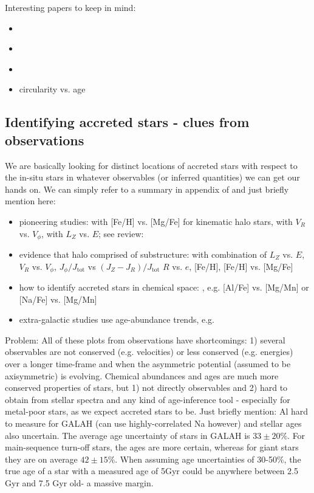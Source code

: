 \documentclass[fleqn,usenatbib]{mnras}
\begin{document}
Interesting papers to keep in mind:
\begin{itemize}
    \item \citet{Martig2021}
    \item \citet{GarciadelaCruz2021, GarciadelaCruz2021b}
    \item \citet{Pinna2019,Pinna2019b}
    \item circularity vs. age \citet{Zhu2022}
\end{itemize}

\subsection{Identifying accreted stars - clues from observations}

We are basically looking for distinct locations of accreted stars with respect to the in-situ stars in whatever observables (or inferred quantities) we can get our hands on. We can simply refer to a summary in appendix of \citet{Buder2022} and just briefly mention here:
\begin{itemize}
    \item pioneering studies: \citet{Nissen2010} with [Fe/H] vs. [Mg/Fe] for kinematic halo stars, \citet{Belokurov2018} with $V_R$ vs. $V_\phi$, \citet{Helmi2018} with $L_Z$ vs. $E$; see review: \citet{Helmi2020}
    \item evidence that halo comprised of substructure: \citet{Naidu2020} with combination of $L_Z$ vs. $E$, $V_R$ vs. $V_\phi$, $J_\phi/J_\text{tot}$ vs $(J_Z - J_R)/J_\text{tot}$ $R$ vs. $e$, [Fe/H], [Fe/H] vs. [Mg/Fe]
    \item how to identify accreted stars in chemical space: \citet{Hawkins2015, Das2020, Buder2022}, e.g. [Al/Fe] vs. [Mg/Mn] or [Na/Fe] vs. [Mg/Mn]
    \item extra-galactic studies use age-abundance trends, e.g. \citet{Martig2021}
\end{itemize}

Problem: All of these plots from observations have shortcomings: 1) several observables are not conserved (e.g. velocities) or less conserved (e.g. energies) over a longer time-frame and when the asymmetric potential (assumed to be axisymmetric) is evolving. Chemical abundances and ages are much more conserved properties of stars, but 1) not directly observables and 2) hard to obtain from stellar spectra and any kind of age-inference tool - especially for metal-poor stars, as we expect accreted stars to be. Just briefly mention: Al hard to measure for GALAH (can use highly-correlated Na however) and stellar ages also uncertain. The average age uncertainty of stars in GALAH is $33 \pm 20\%$. For main-sequence turn-off stars, the ages are more certain, whereas for giant stars they are on average $42 \pm 15\%$. When assuming age uncertainties of 30-50\%, the true age of a star with a measured age of 5Gyr could be anywhere between 2.5 Gyr and 7.5 Gyr old- a massive margin.
\end{document}
